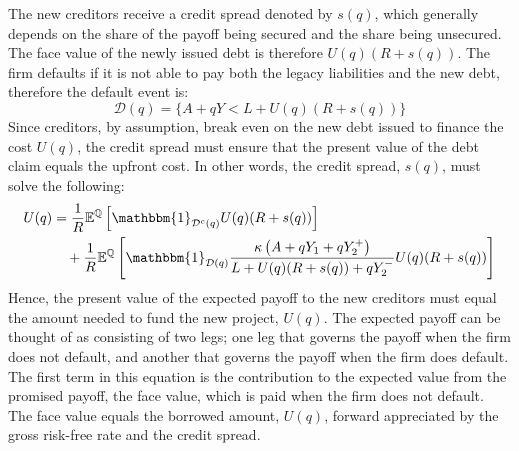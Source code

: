 \documentclass[../main.tex]{subfiles}
\begin{document}
        The new creditors receive a credit spread denoted by $s(q)$,
        which generally depends on the share of the payoff being secured and the share being unsecured.
        The face value of the newly issued debt is therefore $U(q)(R + s(q))$.
        The firm defaults if it is not able to pay both the legacy liabilities and the new debt,
        therefore the default event is:
            \begin{equation*}
                \mathcal{D}(q)
                = 
                \{
                    A + qY < L + U(q)(R + s(q))
                \}
            \end{equation*}
        Since creditors, by assumption, break even on the new debt issued to finance the cost $U(q)$,
        the credit spread must ensure that the present value of the debt claim equals the upfront cost.
        In other words, the credit spread, $s(q)$, must solve the following:
            \begin{align}
                    U(q) 
                &=
                    \discountfactor
                    \mathbb{E}^{\rnmeasure}\left[
                        \mathbbm{1}_{\mathcal{D}^{c}(q)}
                        U(q)
                        (\grossrfrate + s(q))
                    \right]
                \nonumber \\
                &\quad+
                    \discountfactor
                    \mathbb{E}^{\rnmeasure}\left[
                        \mathbbm{1}_{\mathcal{D}(q)}
                        \frac{
                            \kappa 
                            \left(
                                A + q Y_{1} + q Y_{2}^{+}
                            \right)
                        }{
                            L 
                            +
                            U(q)
                            (\grossrfrate + s(q))
                            +
                            q Y_{2}^{-} 
                        } 
                        U(q)
                        (\grossrfrate + s(q))    
                    \right] 
                \label{eqn:new-creditors-breakeven}
            \end{align}
        Hence, the present value of the expected payoff to the new creditors
        must equal the amount needed to fund the new project, $U(q)$. 
        The expected payoff can be thought of as consisting of two legs;
        one leg that governs the payoff when the firm does not default, 
        and another that governs the payoff when the firm does default.
        \\
        The first term in this equation is the contribution to the expected value from the promised payoff,
        the face value, which is paid when the firm does not default. 
        The face value equals the borrowed amount, $U(q)$, 
        forward appreciated by the gross risk-free rate and the credit spread.
        
\end{document}
